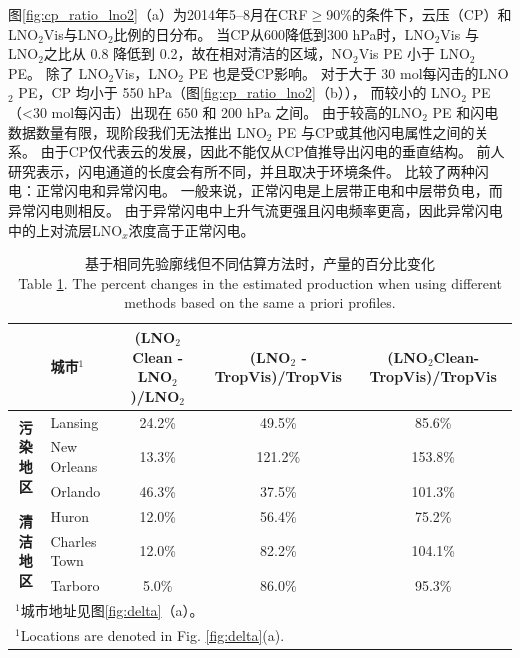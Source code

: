 图\ref{fig:cp_ratio_lno2}（a）为2014年5--8月在CRF$\geq$90\%的条件下，云压（CP）和LNO$_2$Vis与LNO$_2$比例的日分布。
当CP从600降低到300 hPa时，LNO$_2$Vis 与 LNO$_2$之比从 0.8 降低到 0.2，故在相对清洁的区域，NO$_2$Vis PE 小于 LNO$_2$ PE。
除了 LNO$_2$Vis，LNO$_2$ PE 也是受CP影响。
对于大于 30 mol每闪击的LNO$_2$ PE，CP 均小于 550 hPa（图\ref{fig:cp_ratio_lno2}（b）），
而较小的 LNO$_2$ PE（<30 mol每闪击）出现在 650 和 200 hPa 之间。
由于较高的LNO$_2$ PE 和闪电数据数量有限，现阶段我们无法推出 LNO$_2$ PE 与CP或其他闪电属性之间的关系。
由于CP仅代表云的发展，因此不能仅从CP值推导出闪电的垂直结构。
前人研究表示，闪电通道的长度会有所不同，并且取决于环境条件\citep{Carey.2016,Mecikalski.2017,Fuchs.2018}。
\citet{Davis.2019}比较了两种闪电：正常闪电和异常闪电。
一般来说，正常闪电是上层带正电和中层带负电，而异常闪电则相反\citep{Williams.1989}。
由于异常闪电中上升气流更强且闪电频率更高，因此异常闪电中的上对流层LNO$_x$浓度高于正常闪电。


\begin{table}[htbp]
\scriptsize
\caption{基于相同先验廓线但不同估算方法时，产量的百分比变化\\Table \ref{table:production_comp}. The percent changes in the estimated production when using different methods based on the same a priori profiles.}
\begin{tabular}{clccc}
\hline
\textbf{} & \textbf{城市$^1$} & \textbf{(LNO$_\textrm{2}$Clean - LNO$_\textrm{2}$)/LNO$_\textrm{2}$} & \textbf{(LNO$_\textrm{2}$ - TropVis)/TropVis} & \textbf{(LNO$_\textrm{2}$Clean-TropVis)/TropVis} \\
\hline
\multirow{3}{*}{\textbf{污染地区}} & Lansing          & 24.2\%  & 49.5\%   & 85.6\%   \\
                                   & New Orleans      & 13.3\%  & 121.2\%  & 153.8\%  \\
                                   & Orlando          & 46.3\%  & 37.5\%   & 101.3\%  \\
\hline
\multirow{3}{*}{\textbf{清洁地区}}    & Huron            & 12.0\%  & 56.4\%   & 75.2\%   \\
                                   & Charles Town     & 12.0\%  & 82.2\%   & 104.1\%  \\
                                   & Tarboro          & 5.0\%   & 86.0\%   & 95.3\%   \\
\hline
\multicolumn{5}{l}{$^1$城市地址见图\ref{fig:delta}（a）。}\\
\multicolumn{5}{l}{$^1$Locations are denoted in Fig. \ref{fig:delta}(a).}
\end{tabular}
\label{table:production_comp}
\end{table}

